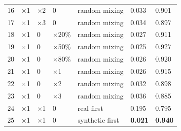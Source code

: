 \documentclass[letterpaper]{article} %
\begin{document}
\begin{table}[t]
{\begin{tabular}{lllllll}
			16& $\times$1 	 	& $\times$2   &0 			&random mixing &0.033 &0.901 \\
			17& $\times$1 	 	& $\times$3   &0 			&random mixing &0.034 &0.897 \\	
			18& $\times$1 	 	&0 		&  $\times$20\%	 	&random mixing &0.027 &0.911 \\
			19& $\times$1 	 	&0 		&  $\times$50\% 	&random mixing &0.025 &0.927 \\
			20& $\times$1    	&0 		&  $\times$80\% 	&random mixing &0.026 &0.920 \\
			21& $\times$1 	 	&0 		&  $\times$1    &random mixing &0.026 &0.915 \\
			22& $\times$1 	 	&0 		&  $\times$2   &random mixing &0.032 &0.898 \\
			23& $\times$1 	 	&0 		&  $\times$3   &random mixing &0.036 &0.885 \\			
			24& $\times$1 	 	& $\times$1 	&0  		&real first &0.195 &0.795 \\
			25& $\times$1 	 	& $\times$1 	&0  		&synthetic first &\textbf{0.021} &\textbf{0.940} \\
			\bottomrule
		\end{tabular}
	}
	\label{availability_test}
\end{table}
\end{document}
